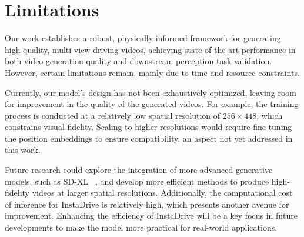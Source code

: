 \section{Limitations}

Our work establishes a robust, physically informed framework for generating high-quality, multi-view driving videos, achieving state-of-the-art performance in both video generation quality and downstream perception task validation. However, certain limitations remain, mainly due to time and resource constraints.  

Currently, our model's design has not been exhaustively optimized, leaving room for improvement in the quality of the generated videos. For example, the training process is conducted at a relatively low spatial resolution of $256 \times 448$, which constrains visual fidelity. Scaling to higher resolutions would require fine-tuning the position embeddings to ensure compatibility, an aspect not yet addressed in this work.  

Future research could explore the integration of more advanced generative models, such as SD-XL ~\cite{DBLP:journals/corr/abs-2307-01952}, and develop more efficient methods to produce high-fidelity videos at larger spatial resolutions. Additionally, the computational cost of inference for InstaDrive is relatively high, which presents another avenue for improvement. Enhancing the efficiency of InstaDrive will be a key focus in future developments to make the model more practical for real-world applications.  
